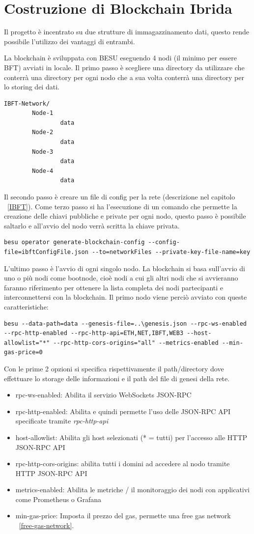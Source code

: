 \documentclass[11pt,a4paper,titlepage]{report}
\begin{document}
\section{Costruzione di Blockchain Ibrida}
Il progetto è incentrato su due strutture di immagazzinamento dati, questo rende possibile l'utilizzo dei vantaggi di entrambi.

La blockchain è sviluppata con BESU eseguendo 4 nodi (il minimo per essere BFT) avviati in locale.
Il primo passo è scegliere una directory da utilizzare che conterrà una directory per ogni nodo che a sua volta conterrà una directory per lo storing dei dati.
\begin{lstlisting}[language=command.com]
IBFT-Network/
		Node-1
				data
		Node-2
				data
		Node-3
				data
		Node-4
				data
\end{lstlisting}

Il secondo passo è creare un file di config per la rete (descrizione nel capitolo ~\ref{IBFT}).
Come terzo passo si ha l'esecuzione di un comando che permette la creazione delle chiavi pubbliche e private per ogni nodo, questo passo è possibile saltarlo e all'avvio del nodo verrà scritta la chiave privata.
\begin{lstlisting}[language=command.com]
besu operator generate-blockchain-config --config-file=ibftConfigFile.json --to=networkFiles --private-key-file-name=key
\end{lstlisting}

L'ultimo passo è l'avvio di ogni singolo nodo. La blockchain si basa sull'avvio di uno o più nodi come bootnode, cioè nodi a cui gli altri nodi che si avvieranno faranno riferimento per ottenere la lista completa dei nodi partecipanti e interconnettersi con la blockchain.
Il primo nodo viene perciò avviato con queste caratteristiche:
\begin{lstlisting}[language=command.com]
besu --data-path=data --genesis-file=..\genesis.json --rpc-ws-enabled --rpc-http-enabled --rpc-http-api=ETH,NET,IBFT,WEB3 --host-allowlist="*" --rpc-http-cors-origins="all" --metrics-enabled --min-gas-price=0
\end{lstlisting}

Con le prime 2 opzioni si specifica rispettivamente il path/directory dove effettuare lo storage delle informazioni e il path del file di genesi della rete. 
\begin{itemize}
\item rpc-ws-enabled: Abilita il servizio WebSockets JSON-RPC
\item rpc-http-enabled: Abilita e quindi permette l'uso delle JSON-RPC API specificate tramite \textit{rpc-http-api}
\item host-allowlist: Abilita gli host selezionati (* = tutti) per l'accesso alle HTTP JSON-RPC API
\item rpc-http-cors-origins: abilita tutti i domini ad accedere al nodo tramite HTTP JSON-RPC API
\item metrics-enabled: Abilita le metriche / il monitoraggio dei nodi con applicativi come Prometheus o Grafana
\item min-gas-price: Imposta il prezzo del gas, permette una free gas network ~\ref{free-gas-network}.
\end{itemize}
\end{document}
